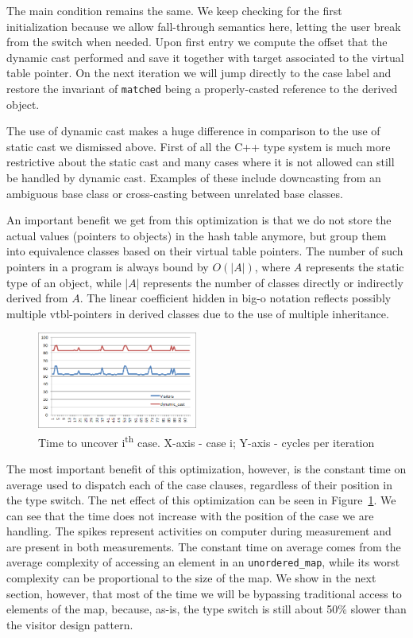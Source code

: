 \documentclass[preprint]{sigplanconf}
\makeatletter
\DeclareRobustCommand{\code}[1]{{\lstinline[breaklines=false,escapechar=@]{#1}}}
\makeatother
\begin{document}
\noindent
The main condition remains the same. We keep checking for the first initialization 
because we allow fall-through semantics here, letting the user break from the 
switch when needed. Upon first entry we compute the offset that the dynamic cast 
performed and save it together with target associated to the virtual table 
pointer. On the next iteration we will jump directly to the case label and 
restore the invariant of \code{matched} being a properly-casted reference to the 
derived object.

The use of dynamic cast makes a huge difference in comparison to the use of 
static cast we dismissed above. First of all the C++ type system is much more 
restrictive about the static cast and many cases where it is not allowed can 
still be handled by dynamic cast. Examples of these include downcasting from an 
ambiguous base class or cross-casting between unrelated base classes.

An important benefit we get from this optimization is that we do not store the 
actual values (pointers to objects) in the hash table anymore, but group them 
into equivalence classes based on their virtual table pointers. The number of 
such pointers in a program is always bound by $O(|A|)$, where $A$ represents the 
static type of an object, while $|A|$ represents the number of classes directly 
or indirectly derived from $A$. The linear coefficient hidden in big-o notation 
reflects possibly multiple vtbl-pointers in derived classes due to the use of 
multiple inheritance.

\begin{figure}[htbp]
  \centering
    \includegraphics[width=0.47\textwidth]{DCast-vs-Visitors3.png}
  \caption{Time to uncover i\textsuperscript{th} case. X-axis - case i; Y-axis - cycles per iteration}
  \label{fig:DCastVis3}
\end{figure}

The most important benefit of this optimization, however, is the constant time 
on average used to dispatch each of the case clauses, regardless of their 
position in the type switch. The net effect of this optimization can be seen in Figure~\ref{fig:DCastVis3}. 
We can see that the time does not increase with the position of the case we are 
handling. The spikes represent activities on computer during measurement and are 
present in both measurements. 
The constant time on average comes from the average complexity 
of accessing an element in an \code{unordered_map}, while its worst complexity can 
be proportional to the size of the map. We show in the next section, however, 
that most of the time we will be bypassing traditional access to elements of the 
map, because, as-is, the type switch is still about 50\% slower than the visitor 
design pattern.
\end{document}
